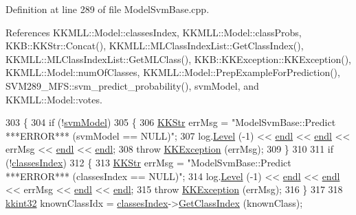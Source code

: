 Definition at line 289 of file Model\+Svm\+Base.\+cpp.



References K\+K\+M\+L\+L\+::\+Model\+::classes\+Index, K\+K\+M\+L\+L\+::\+Model\+::class\+Probs, K\+K\+B\+::\+K\+K\+Str\+::\+Concat(), K\+K\+M\+L\+L\+::\+M\+L\+Class\+Index\+List\+::\+Get\+Class\+Index(), K\+K\+M\+L\+L\+::\+M\+L\+Class\+Index\+List\+::\+Get\+M\+L\+Class(), K\+K\+B\+::\+K\+K\+Exception\+::\+K\+K\+Exception(), K\+K\+M\+L\+L\+::\+Model\+::num\+Of\+Classes, K\+K\+M\+L\+L\+::\+Model\+::\+Prep\+Example\+For\+Prediction(), S\+V\+M289\+\_\+\+M\+F\+S\+::svm\+\_\+predict\+\_\+probability(), svm\+Model, and K\+K\+M\+L\+L\+::\+Model\+::votes.


\begin{DoxyCode}
303 \{
304   \textcolor{keywordflow}{if}  (!\hyperlink{class_k_k_m_l_l_1_1_model_svm_base_a8f6ed793dfaa080ddea8e1776d2ee755}{svmModel})
305   \{
306     \hyperlink{class_k_k_b_1_1_k_k_str}{KKStr} errMsg = \textcolor{stringliteral}{"ModelSvmBase::Predict   ***ERROR***      (svmModel == NULL)"};
307     log.\hyperlink{class_k_k_b_1_1_run_log_a32cf761d7f2e747465fd80533fdbb659}{Level} (-1) << \hyperlink{namespace_k_k_b_ad1f50f65af6adc8fa9e6f62d007818a8}{endl} << \hyperlink{namespace_k_k_b_ad1f50f65af6adc8fa9e6f62d007818a8}{endl} << errMsg << \hyperlink{namespace_k_k_b_ad1f50f65af6adc8fa9e6f62d007818a8}{endl} << \hyperlink{namespace_k_k_b_ad1f50f65af6adc8fa9e6f62d007818a8}{endl};
308     \textcolor{keywordflow}{throw} \hyperlink{class_k_k_b_1_1_k_k_exception}{KKException} (errMsg);
309   \}
310 
311   \textcolor{keywordflow}{if}  (!\hyperlink{class_k_k_m_l_l_1_1_model_adbb9475e16bb2c3eef52170485e3018e}{classesIndex})
312   \{
313     \hyperlink{class_k_k_b_1_1_k_k_str}{KKStr} errMsg = \textcolor{stringliteral}{"ModelSvmBase::Predict   ***ERROR***      (classesIndex == NULL)"};
314     log.\hyperlink{class_k_k_b_1_1_run_log_a32cf761d7f2e747465fd80533fdbb659}{Level} (-1) << \hyperlink{namespace_k_k_b_ad1f50f65af6adc8fa9e6f62d007818a8}{endl} << \hyperlink{namespace_k_k_b_ad1f50f65af6adc8fa9e6f62d007818a8}{endl} << errMsg << \hyperlink{namespace_k_k_b_ad1f50f65af6adc8fa9e6f62d007818a8}{endl} << \hyperlink{namespace_k_k_b_ad1f50f65af6adc8fa9e6f62d007818a8}{endl};
315     \textcolor{keywordflow}{throw} \hyperlink{class_k_k_b_1_1_k_k_exception}{KKException} (errMsg);
316   \}
317 
318   \hyperlink{namespace_k_k_b_a8fa4952cc84fda1de4bec1fbdd8d5b1b}{kkint32}  knownClassIdx = \hyperlink{class_k_k_m_l_l_1_1_model_adbb9475e16bb2c3eef52170485e3018e}{classesIndex}->\hyperlink{class_k_k_m_l_l_1_1_m_l_class_index_list_a9fadd1a6477ef0decfe0ff6b5db9daed}{GetClassIndex} (knownClass);

\end{DoxyCode}
